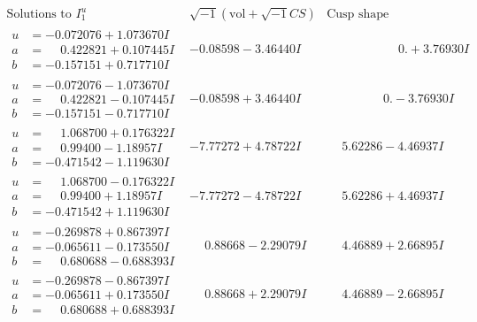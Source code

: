 \documentclass[1p]{elsarticle_modified}
\theoremstyle{definition}
\newcommand{\I}{\sqrt{-1}}
\begin{document}
$$\begin{array}{c|c|c}  
\text{Solutions to }I^u_{1}& \I (\text{vol} + \sqrt{-1}CS) & \text{Cusp shape}\\
 \hline 
\begin{aligned}
u &= -0.072076 + 1.073670 I \\
a &= \phantom{-}0.422821 + 0.107445 I \\
b &= -0.157151 + 0.717710 I\end{aligned}
 & -0.08598 - 3.46440 I & \phantom{-0.000000 -}0. + 3.76930 I \\ \hline\begin{aligned}
u &= -0.072076 - 1.073670 I \\
a &= \phantom{-}0.422821 - 0.107445 I \\
b &= -0.157151 - 0.717710 I\end{aligned}
 & -0.08598 + 3.46440 I & \phantom{-0.000000 } 0. - 3.76930 I \\ \hline\begin{aligned}
u &= \phantom{-}1.068700 + 0.176322 I \\
a &= \phantom{-}0.99400 - 1.18957 I \\
b &= -0.471542 - 1.119630 I\end{aligned}
 & -7.77272 + 4.78722 I & \phantom{-}5.62286 - 4.46937 I \\ \hline\begin{aligned}
u &= \phantom{-}1.068700 - 0.176322 I \\
a &= \phantom{-}0.99400 + 1.18957 I \\
b &= -0.471542 + 1.119630 I\end{aligned}
 & -7.77272 - 4.78722 I & \phantom{-}5.62286 + 4.46937 I \\ \hline\begin{aligned}
u &= -0.269878 + 0.867397 I \\
a &= -0.065611 - 0.173550 I \\
b &= \phantom{-}0.680688 - 0.688393 I\end{aligned}
 & \phantom{-}0.88668 - 2.29079 I & \phantom{-}4.46889 + 2.66895 I \\ \hline\begin{aligned}
u &= -0.269878 - 0.867397 I \\
a &= -0.065611 + 0.173550 I \\
b &= \phantom{-}0.680688 + 0.688393 I\end{aligned}
 & \phantom{-}0.88668 + 2.29079 I & \phantom{-}4.46889 - 2.66895 I \\ \hline\begin{aligned}

\end{aligned}
\end{array}$$
\end{document}
